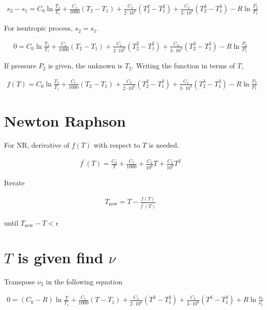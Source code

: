 \documentclass{article}
\begin{document}
	\begin{align*}
		s_2 - s_1 = C_0\ln\frac{T_2}{T_1} + \frac{C_1}{1000}(T_2 - T_1) + \frac{C_2}{2\cdot10^6}(T_2^2 - T_1^2) + \frac{C_2}{3\cdot10^9}(T_2^3 - T_1^3) - R\ln\frac{P_2}{P_1}
	\end{align*}

	For isentropic process, $s_2=s_1$.

	\begin{align*}
		0 = C_0\ln\frac{T_2}{T_1} + \frac{C_1}{1000}(T_2 - T_1) + \frac{C_2}{2\cdot10^6}(T_2^2 - T_1^2) + \frac{C_2}{3\cdot10^9}(T_2^3 - T_1^3) - R\ln\frac{P_2}{P_1}
	\end{align*}

	If pressure $P_2$ is given, the unknown is $T_2$. Writing the function in terms of $T$,

	\begin{align*}
		f(T) = C_0\ln\frac{T_2}{T_1} + \frac{C_1}{1000}(T_2 - T_1) + \frac{C_2}{2\cdot10^6}(T_2^2 - T_1^2) + \frac{C_2}{3\cdot10^9}(T_2^3 - T_1^3) - R\ln\frac{P_2}{P_1}
	\end{align*}
	
	\section{Newton Raphson}

	For NR, derivative of $f(T)$ with respect to $T$ is needed.

	\begin{align*}
		f^\prime(T) = \frac{C_0}{T} + \frac{C_1}{1000} + \frac{C_2}{10^6}T + \frac{C_2}{10^9}T^2
	\end{align*}

	Iterate

	\begin{align*}
		T_\text{new} = T - \frac{f(T)}{f^\prime(T)}
	\end{align*}

	until $T_\text{new} - T < \epsilon$

	\section{$T$ is given find $\nu$}

	Transpose $\nu_2$ in the following equation

	\begin{align*}
		0 = (C_0 - R)\ln\frac{T}{T_1} + \frac{C_1}{1000}(T - T_1) + \frac{C_2}{2\cdot10^6}(T^2 - T_1^2) + \frac{C_2}{3\cdot10^9}(T^3 - T_1^3) + R\ln\frac{\nu_2}{\nu_1}
	\end{align*}
\end{document}
